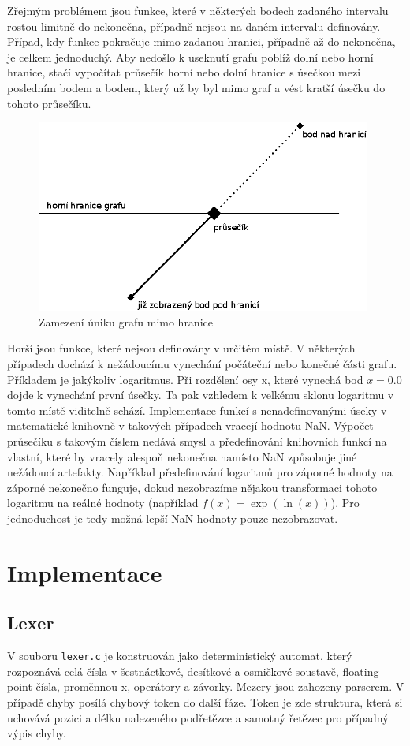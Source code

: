 \documentclass[11pt]{article}
\begin{document}
Zřejmým problémem jsou funkce, které v některých bodech zadaného intervalu
rostou limitně do nekonečna, případně nejsou na daném intervalu definovány.
Případ, kdy funkce pokračuje mimo zadanou hranici, případně až do nekonečna, je
celkem jednoduchý. Aby nedošlo k useknutí grafu poblíž dolní nebo horní
hranice, stačí vypočítat průsečík horní nebo dolní hranice s úsečkou mezi
posledním bodem a bodem, který už by byl mimo graf a vést kratší úsečku do
tohoto průsečíku. 
\begin{figure}[ht!]
\centering
	\includegraphics[width=11cm]{figures/boundary.eps}
	\caption{Zamezení úniku grafu mimo hranice}
\end{figure}

Horší jsou funkce, které nejsou definovány v určitém místě. V některých
případech dochází k nežádoucímu vynechání počáteční nebo konečné části grafu.
Příkladem je jakýkoliv logaritmus. Při rozdělení osy x, které vynechá bod $x =
0.0$ dojde k vynechání první úsečky. Ta pak vzhledem k velkému sklonu logaritmu
v tomto místě viditelně schází. Implementace funkcí s nenadefinovanými úseky v
matematické knihovně v takových případech vracejí hodnotu NaN. Výpočet
průsečíku s takovým číslem nedává smysl a předefinování knihovních funkcí na
vlastní, které by vracely alespoň nekonečna namísto NaN způsobuje jiné
nežádoucí artefakty. Například předefinování logaritmů pro záporné hodnoty na
záporné nekonečno funguje, dokud nezobrazíme nějakou transformaci tohoto
logaritmu na reálné hodnoty (například $f(x) = \exp(\ln(x))$). Pro jednoduchost
je tedy možná lepší NaN hodnoty pouze nezobrazovat.


\section{Implementace}
\subsection{Lexer} 
V souboru \texttt{lexer.c} je konstruován jako deterministický automat, který
rozpoznává celá čísla v šestnáctkové, desítkové a osmičkové soustavě, floating
point čísla, proměnnou x, operátory a závorky. Mezery jsou zahozeny parserem. V
případě chyby posílá chybový token do další fáze.  Token je zde struktura,
která si uchovává pozici a délku nalezeného podřetězce a samotný řetězec pro
případný výpis chyby.
\end{document}

